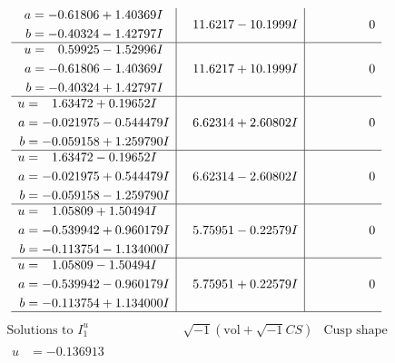 \documentclass[1p]{elsarticle_modified}
\theoremstyle{definition}
\newcommand{\I}{\sqrt{-1}}
\begin{document}
$$\begin{array}{c|c|c}
\begin{aligned}
a &= -0.61806 + 1.40369 I \\
b &= -0.40324 - 1.42797 I\end{aligned}
 & \phantom{-}11.6217 - 10.1999 I & \phantom{-0.000000 } 0 \\ \hline\begin{aligned}
u &= \phantom{-}0.59925 - 1.52996 I \\
a &= -0.61806 - 1.40369 I \\
b &= -0.40324 + 1.42797 I\end{aligned}
 & \phantom{-}11.6217 + 10.1999 I & \phantom{-0.000000 } 0 \\ \hline\begin{aligned}
u &= \phantom{-}1.63472 + 0.19652 I \\
a &= -0.021975 - 0.544479 I \\
b &= -0.059158 + 1.259790 I\end{aligned}
 & \phantom{-}6.62314 + 2.60802 I & \phantom{-0.000000 } 0 \\ \hline\begin{aligned}
u &= \phantom{-}1.63472 - 0.19652 I \\
a &= -0.021975 + 0.544479 I \\
b &= -0.059158 - 1.259790 I\end{aligned}
 & \phantom{-}6.62314 - 2.60802 I & \phantom{-0.000000 } 0 \\ \hline\begin{aligned}
u &= \phantom{-}1.05809 + 1.50494 I \\
a &= -0.539942 + 0.960179 I \\
b &= -0.113754 - 1.134000 I\end{aligned}
 & \phantom{-}5.75951 - 0.22579 I & \phantom{-0.000000 } 0 \\ \hline\begin{aligned}
u &= \phantom{-}1.05809 - 1.50494 I \\
a &= -0.539942 - 0.960179 I \\
b &= -0.113754 + 1.134000 I\end{aligned}
 & \phantom{-}5.75951 + 0.22579 I & \phantom{-0.000000 } 0\\
 \hline 
 \end{array}$$\newpage$$\begin{array}{c|c|c}  
\text{Solutions to }I^u_{1}& \I (\text{vol} + \sqrt{-1}CS) & \text{Cusp shape}\\
 \hline 
\begin{aligned}
u &= -0.136913\phantom{ +0.000000I} \\

\end{aligned}
\end{array}$$
\end{document}

